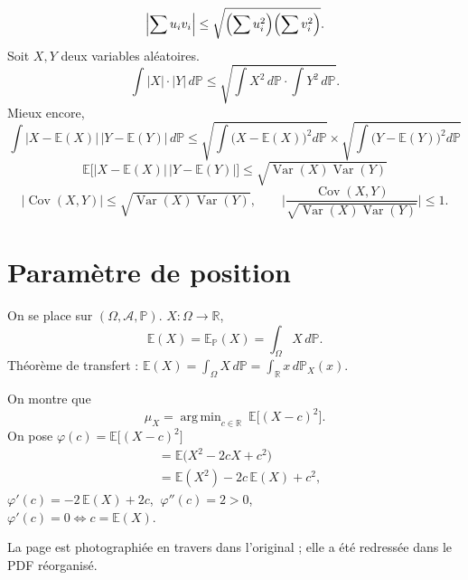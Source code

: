 \documentclass[11pt,a4paper]{article}
\newcommand{\R}{\mathbb{R}}
\newcommand{\A}{\mathscr{A}}
\newcommand{\PP}{\mathbb{P}}
\newcommand{\EE}{\mathbb{E}}
\DeclareMathOperator{\Var}{Var}
\DeclareMathOperator{\Cov}{Cov}
\DeclareMathOperator*{\argmin}{arg\,min}
\begin{document}
\[
  \Bigl|\sum u_iv_i\Bigr|\le\sqrt{\Bigl(\sum u_i^2\Bigr)\Bigl(\sum v_i^2\Bigr)}.
\]
Soit $X,Y$ deux variables aléatoires.
\[
  \int|X|\cdot|Y|\,d\PP\le\sqrt{\int X^2\,d\PP\cdot\int Y^2\,d\PP}.
\]
Mieux encore,
\[
  \int|X-\EE(X)|\,|Y-\EE(Y)|\,d\PP\le\sqrt{\int\bigl(X-\EE(X)\bigr)^2d\PP}\times\sqrt{\int\bigl(Y-\EE(Y)\bigr)^2d\PP}
\]
\[
  \EE\bigl[|X-\EE(X)|\,|Y-\EE(Y)|\bigr]\le\sqrt{\Var(X)\Var(Y)}
\]
\[
  |\Cov(X,Y)|\le\sqrt{\Var(X)\Var(Y)},\qquad\Biggl|\frac{\Cov(X,Y)}{\sqrt{\Var(X)\Var(Y)}}\Biggr|\le1 .
\]

\section*{Paramètre de position}

On se place sur $(\Omega,\A,\PP)$. $X:\Omega\to\R$,
\[
  \EE(X)=\EE_{\PP}(X)=\int_\Omega X\,d\PP .
\]
Théorème de transfert : $\displaystyle\EE(X)=\int_\Omega X\,d\PP=\int_\R x\,d\PP_X(x)$.

On montre que
\[
  \mu_X=\argmin_{c\in\R}\ \EE\bigl[(X-c)^2\bigr].
\]
On pose $\varphi(c)=\EE\bigl[(X-c)^2\bigr]$
\begin{align*}
  &=\EE\bigl(X^2-2cX+c^2\bigr)\\
  &=\EE(X^2)-2c\,\EE(X)+c^2 ,
\end{align*}
$\varphi'(c)=-2\,\EE(X)+2c$, $\ \varphi''(c)=2>0$,\\
$\varphi'(c)=0\iff c=\EE(X)$.

\begin{note}
La page est photographiée en travers dans l'original ; elle a été redressée dans le PDF réorganisé.
\end{note}
\end{document}
